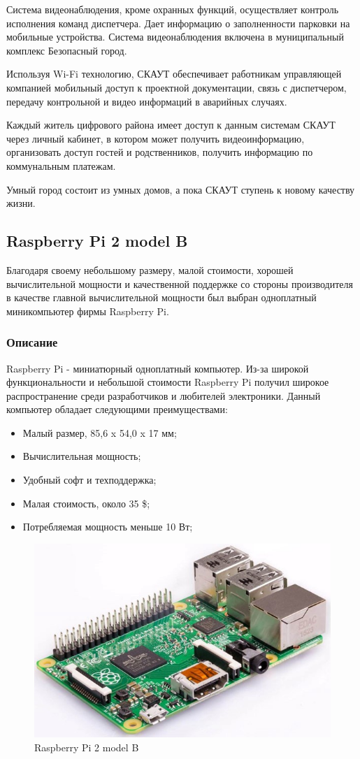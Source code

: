 Система видеонаблюдения, кроме охранных функций, осуществляет контроль исполнения команд диспетчера. Дает информацию о заполненности парковки на мобильные устройства. Система видеонаблюдения включена в муниципальный комплекс Безопасный город.

Используя Wi-Fi технологию, СКАУТ обеспечивает работникам управляющей компанией мобильный доступ к проектной документации, связь с диспетчером, передачу контрольной и видео информаций в аварийных случаях. 

Каждый житель цифрового района имеет доступ к данным системам СКАУТ через личный кабинет, в котором может получить видеоинформацию, организовать доступ гостей и родственников, получить информацию по коммунальным платежам. 

Умный город состоит из умных домов, а пока СКАУТ ступень к новому качеству жизни.

\subsection{Raspberry Pi 2 model B}

Благодаря своему небольшому размеру, малой стоимости, хорошей вычислительной мощности и качественной поддержке со стороны производителя в качестве главной вычислительной мощности был выбран одноплатный миникомпьютер фирмы Raspberry Pi. 

\subsubsection{Описание}

Raspberry Pi - миниатюрный одноплатный компьютер. \cite{Raspberry} Из-за широкой функциональности и небольшой стоимости Raspberry Pi получил широкое распространение среди разработчиков и любителей электроники.   Данный компьютер обладает следующими преимуществами:

\begin{itemize}
	\item Малый размер, 85,6 x 54,0 x 17 мм;
	\item Вычислительная мощность;
	\item Удобный софт и техподдержка;
	\item Малая стоимость, около 35 \$;
	\item Потребляемая мощность меньше 10 Вт;
\end{itemize}

\begin{figure}[H]
	\centering
	\includegraphics[width=0.7\linewidth]{pics/raspberry}
	\caption{Raspberry Pi 2 model B}
	\label{fig:raspberry} 
\end{figure}

